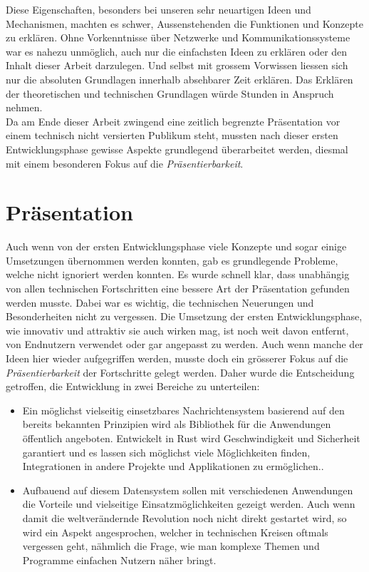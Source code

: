 \documentclass[a4paper,11pt,titlepage,twoside]{memoir}
\begin{document}
\noindent Diese Eigenschaften, besonders bei unseren sehr neuartigen
Ideen und Mechanismen, machten es schwer, Aussenstehenden die
Funktionen und Konzepte zu erklären. Ohne Vorkenntnisse über Netzwerke
und Kommunikationssysteme war es nahezu unmöglich, auch nur die
einfachsten Ideen zu erklären oder den Inhalt dieser Arbeit
darzulegen. Und selbst mit grossem Vorwissen liessen sich nur die
absoluten Grundlagen innerhalb absehbarer Zeit erklären. Das Erklären
der theoretischen und technischen Grundlagen würde Stunden in Anspruch
nehmen.\\

\noindent Da am Ende dieser Arbeit zwingend eine zeitlich begrenzte
Präsentation vor einem technisch nicht versierten Publikum steht,
mussten nach dieser ersten Entwicklungsphase gewisse Aspekte
grundlegend überarbeitet werden, diesmal mit einem besonderen Fokus
auf die \emph{Präsentierbarkeit}.
\section{Präsentation}
\label{sec:orgc179d2f}
Auch wenn von der ersten Entwicklungsphase viele Konzepte und sogar
einige Umsetzungen übernommen werden konnten, gab es grundlegende
Probleme, welche nicht ignoriert werden konnten. Es wurde schnell
klar, dass unabhängig von allen technischen Fortschritten eine bessere
Art der Präsentation gefunden werden musste. Dabei war es wichtig, die
technischen Neuerungen und Besonderheiten nicht zu vergessen. Die
Umsetzung der ersten Entwicklungsphase, wie innovativ und attraktiv
sie auch wirken mag, ist noch weit davon entfernt, von Endnutzern
verwendet oder gar angepasst zu werden. Auch wenn manche der Ideen
hier wieder aufgegriffen werden, musste doch ein grösserer Fokus auf
die \emph{Präsentierbarkeit} der Fortschritte gelegt werden. Daher wurde die
Entscheidung getroffen, die Entwicklung in zwei Bereiche zu
unterteilen:
\begin{itemize}
\item Ein möglichst vielseitig einsetzbares Nachrichtensystem basierend
auf den bereits bekannten Prinzipien wird als Bibliothek für die
Anwendungen öffentlich angeboten. Entwickelt in Rust wird
Geschwindigkeit und Sicherheit garantiert und es lassen sich
möglichst viele Möglichkeiten finden, Integrationen in andere
Projekte und Applikationen zu ermöglichen..
\item Aufbauend auf diesem Datensystem sollen mit verschiedenen
Anwendungen die Vorteile und vielseitige Einsatzmöglichkeiten
gezeigt werden. Auch wenn damit die weltverändernde Revolution noch
nicht direkt gestartet wird, so wird ein Aspekt angesprochen,
welcher in technischen Kreisen oftmals vergessen geht, nähmlich die
Frage, wie man komplexe Themen und Programme einfachen Nutzern näher
bringt.
\end{itemize}
\end{document}
